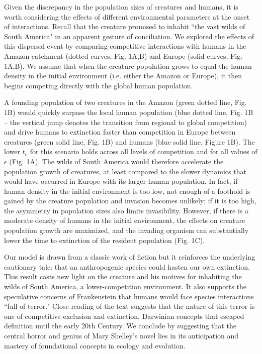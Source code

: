 \documentclass{article}[10pt]
\begin{document}
Given the discrepancy in the population sizes of creatures and humans, it is worth considering the effects of different environmental parameters at the onset of interactions.
Recall that the creature promised to inhabit ``the vast wilds of South America" in an apparent gesture of conciliation.
We explored the effects of this dispersal event by comparing competitive interactions with humans in the Amazon catchment (dotted curves, Fig. 1A,B) and Europe (solid curves, Fig. 1A,B).
We assume that when the creature population grows to equal the human density in the initial environment (i.e. either the Amazon or Europe), it then begins competing directly with the global human population.

A founding population of two creatures in the Amazon (green dotted line, Fig. 1B) would quickly surpass the local human population (blue dotted line, Fig. 1B -- the vertical jump denotes the transition from regional to global competition) and drive humans to extinction faster than competition in Europe between creatures (green solid line, Fig. 1B) and humans (blue solid line, Figure 1B).
The lower $t_e$ for this scenario holds across all levels of competition and for all values of $\epsilon$ (Fig. 1A).
The wilds of South America would therefore accelerate the population growth of creatures, at least compared to the slower dynamics that would have occurred in Europe with its larger human population.
In fact, if human density in the initial environment is too low, not enough of a foothold is gained by the creature population and invasion becomes unlikely; if it is too high, the asymmetry in population sizes also limits invasibility.
However, if there is a moderate density of humans in the initial environment, the effects on creature population growth are maximized, and the invading organism can substantially lower the time to extinction of the resident population (Fig. 1C).

Our model is drawn from a classic work of fiction but it reinforces the underlying cautionary tale: that an anthropogenic species could hasten our own extinction. 
This result casts new light on the creature and his motives for inhabiting the wilds of South America, a lower-competition environment.
It also supports the speculative concerns of Frankenstein \textendash that humans would face species interactions ``full of terror." 
Close reading of the text suggests that the nature of this terror is one of competitive exclusion and extinction, Darwinian concepts that escaped definition until the early 20th Century. 
We conclude by suggesting that the central horror and genius of Mary Shelley's novel lies in its anticipation and mastery of foundational concepts in ecology and evolution.
\end{document}
